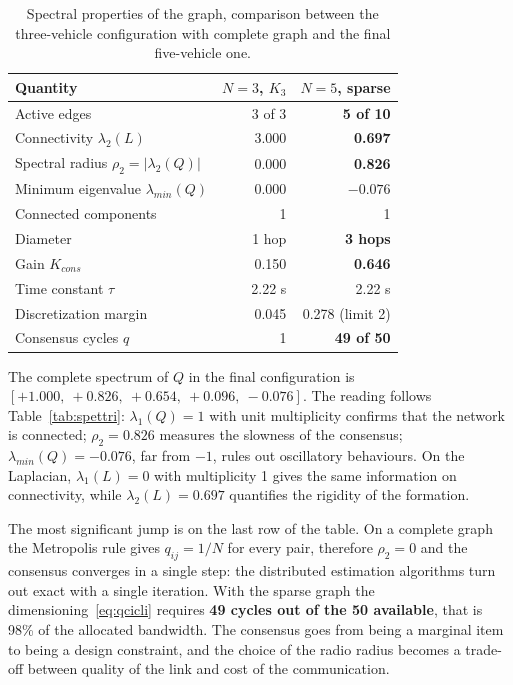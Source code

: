 \documentclass[conference,9pt]{IEEEtran}
\begin{document}
\begin{table}[t]
\centering
\caption{Spectral properties of the graph, comparison between the
three-vehicle configuration with complete graph and the final five-vehicle
one.}
\label{tab:grafo}
\begin{tabular}{lrr}
\toprule
\textbf{Quantity} & \textbf{$N=3$, $K_3$} & \textbf{$N=5$, sparse}\\
\midrule
Active edges                       & 3 of 3 & \textbf{5 of 10}\\
Connectivity $\lambda_2(L)$        & 3.000  & \textbf{0.697}\\
Spectral radius $\rho_2=|\lambda_2(Q)|$ & 0.000 & \textbf{0.826}\\
Minimum eigenvalue $\lambda_{min}(Q)$ & 0.000 & $-0.076$\\
Connected components               & 1      & 1\\
Diameter                           & 1 hop & \textbf{3 hops}\\
Gain $K_{cons}$                    & 0.150  & \textbf{0.646}\\
Time constant $\tau$               & 2.22 s & 2.22 s\\
Discretization margin              & 0.045  & 0.278 (limit 2)\\
Consensus cycles $q$               & 1      & \textbf{49 of 50}\\
\bottomrule
\end{tabular}
\end{table}

The complete spectrum of $Q$ in the final configuration is
$[+1.000,\ +0.826,\ +0.654,\ +0.096,\ -0.076]$. The reading follows
Table~\ref{tab:spettri}: $\lambda_1(Q) = 1$ with unit multiplicity confirms that
the network is connected; $\rho_2 = 0.826$ measures the slowness of the
consensus; $\lambda_{min}(Q) = -0.076$, far from $-1$, rules out oscillatory
behaviours. On the Laplacian, $\lambda_1(L) = 0$ with multiplicity 1 gives the
same information on connectivity, while $\lambda_2(L) = 0.697$ quantifies the
rigidity of the formation.

The most significant jump is on the last row of the table. On a complete graph
the Metropolis rule gives $q_{ij} = 1/N$ for every pair, therefore
$\rho_2 = 0$ and the consensus converges in a single step: the distributed
estimation algorithms turn out exact with a single iteration. With the sparse
graph the dimensioning~\eqref{eq:qcicli} requires \textbf{49 cycles out of the
50 available}, that is 98\% of the allocated bandwidth. The consensus goes from
being a marginal item to being a design constraint, and the choice of the radio
radius becomes a trade-off between quality of the link and cost of the
communication.
\end{document}
